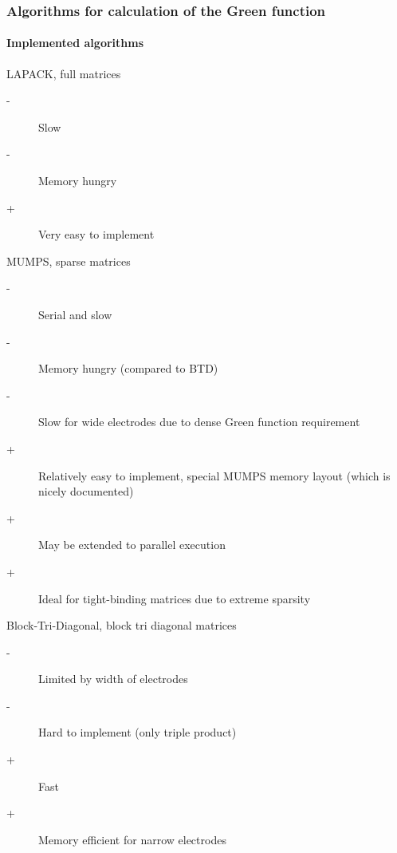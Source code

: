 \begin{frame}
  \frametitle{Algorithms for calculation of the Green function}
  \framesubtitle{Implemented algorithms}

  \footnotesize
  \begin{block}{\small LAPACK, full matrices}

    \begin{description}
      \item[-] Slow
      \item[-] Memory hungry
      \item[+] Very easy to implement
    \end{description}

  \end{block}

  \begin{block}{\small MUMPS, sparse matrices}

    \begin{description}
      \item[-] Serial and slow
      \item[-] Memory hungry (compared to BTD)
      \item[-] Slow for wide electrodes due to dense Green function requirement
      \item[+] Relatively easy to implement, special MUMPS memory layout (which is nicely documented)
      \item[+] May be extended to parallel execution
      \item[+] Ideal for tight-binding matrices due to extreme sparsity
    \end{description}

  \end{block}

  \begin{block}{\small Block-Tri-Diagonal, block tri diagonal matrices}

    \begin{description}
      \item[-] Limited by width of electrodes
      \item[-] Hard to implement (only triple product)
      \item[+] Fast
      \item[+] Memory efficient for narrow electrodes
    \end{description}

  \end{block}


\end{frame}



